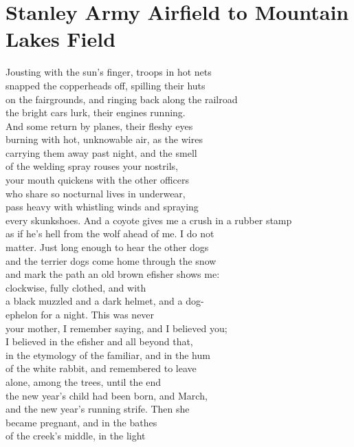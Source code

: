 \documentclass[smalldemyvopaper,11pt,twoside,onecolumn,openright,extrafontsizes]{memoir}
\begin{document}
\chapter{Stanley Army Airfield to Mountain Lakes Field}
Jousting with the sun's finger, troops in hot nets
\\snapped the copperheads off, spilling their huts
\\on the fairgrounds, and ringing back along the railroad
\\the bright cars lurk, their engines running.
\\And some return by planes, their fleshy eyes
\\burning with hot, unknowable air, as the wires
\\carrying them away past night, and the smell
\\of the welding spray rouses your nostrils,
\\your mouth quickens with the other officers
\\who share so nocturnal lives in underwear,
\\pass heavy with whistling winds and spraying
\\every skunkshoes. And a coyote gives me a crush in a rubber stamp
\\as if he's hell from the wolf ahead of me. I do not
\\matter. Just long enough to hear the other dogs
\\and the terrier dogs come home through the snow
\\and mark the path an old brown efisher shows me:
\\clockwise, fully clothed, and with
\\a black muzzled and a dark helmet, and a dog-
\\ephelon for a night. This was never
\\your mother, I remember saying, and I believed you;
\\I believed in the efisher and all beyond that,
\\in the etymology of the familiar, and in the hum
\\of the white rabbit, and remembered to leave
\\alone, among the trees, until the end
\\the new year's child had been born, and March,
\\and the new year's running strife. Then she
\\became pregnant, and in the bathes
\\of the creek's middle, in the light
\end{document}
